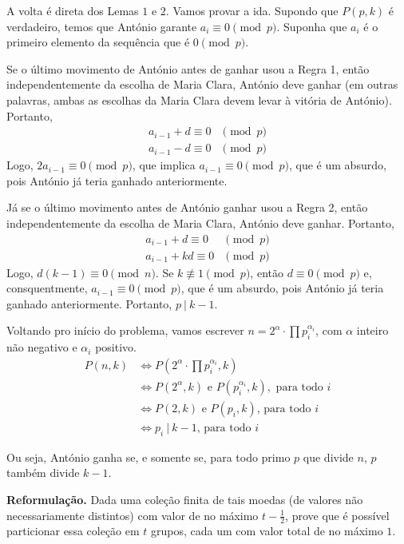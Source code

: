 \documentclass[10pt, a4paper]{article}
\begin{document}
	\begin{dem}
		A volta é direta dos Lemas $1$ e $2$. Vamos provar a ida.
		Supondo que $P(p, k)$ é verdadeiro, temos que António garante $a_i \equiv 0 \pmod{p}$. Suponha que $a_i$ é o primeiro elemento da sequência que é $0 \pmod{p}$.

		Se o último movimento de António antes de ganhar usou a Regra 1, então independentemente da escolha de Maria Clara, António deve ganhar (em outras palavras, ambas as escolhas da Maria Clara devem levar à vitória de António). Portanto,
		\begin{align*}
			a_{i-1} + d \equiv 0 & \pmod p\\
			a_{i-1} - d \equiv 0 & \pmod p
		\end{align*}
		Logo, $2a_{i-1}\equiv 0\pmod p $, que implica $a_{i-1} \equiv 0\pmod p$, que é um absurdo, pois António já teria ganhado anteriormente.

		Já se o último movimento antes de António ganhar usou a Regra 2, então independentemente da escolha de Maria Clara, António deve ganhar. Portanto,
		\begin{align*}
			a_{i-1} + d  \equiv 0 & \pmod p\\
			a_{i-1} + kd \equiv 0 & \pmod p
		\end{align*}
		Logo, $d(k-1)\equiv0 \pmod n$. Se $k \not\equiv 1 \pmod p$, então $d \equiv 0 \pmod p$ e, consquentmente, $a_{i-1} \equiv 0 \pmod p$, que é um absurdo, pois António já teria ganhado anteriormente. Portanto, $p\ |\ k - 1$.
	\end{dem}

	Voltando pro início do problema, vamos escrever $n = 2^\alpha \cdot \prod p_i^{\alpha_i}$, com $\alpha$ inteiro não negativo e $\alpha_i$ positivo.
	\begin{align*}
		P(n, k) &\iff P\left(2^\alpha \cdot \prod p_i^{\alpha_i}, k\right)\\
				&\iff P(2^\alpha, k)\text{ e } P(p_i^{\alpha_i}, k),\text{ para todo $i$}\\
				&\iff P(2, k)\text{ e } P(p_i, k)\text{, para todo $i$}\\
				&\iff p_i\ |\ k - 1 \text{, para todo $i$}
	\end{align*}

	Ou seja, António ganha se, e somente se, para todo primo $p$ que divide $n$, $p$ também divide $k - 1$.
	
	\newpage

	\noindent\textbf{Reformulação.} Dada uma coleção finita de tais moedas (de valores não necessariamente distintos) com valor de no máximo $t - \frac{1}{2}$, prove que é possível particionar essa coleção em $t$ grupos, cada um com valor total de no máximo $1$.
\end{document}
